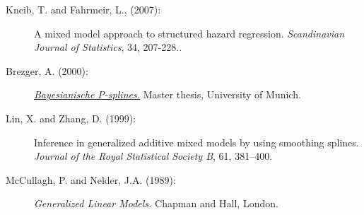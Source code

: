 \begin{description}
\item[Kneib, T. and Fahrmeir, L., (2007):] A mixed model approach
to structured hazard regression. {\em Scandinavian Journal of
Statistics}, 34, 207-228..

\item[Brezger, A. (2000):]
\href{http://www.stat.uni-muenchen.de/~andib} {\em Bayesianische
P-splines.} Master thesis, University of Munich.

\item[Lin, X. and Zhang, D. (1999):] Inference in generalized additive mixed models by using
smoothing splines. {\it Journal of the Royal Statistical Society
B}, 61, 381--400.

\item[McCullagh, P. and Nelder, J.A. (1989):] {\em Generalized Linear Models.} Chapman and Hall, London.

\end{description}
